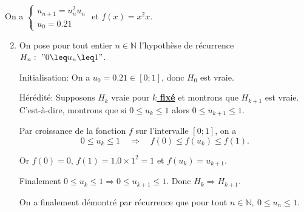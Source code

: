 \documentclass[15pt, mathserif]{beamer}
\begin{document}
\begin{frame}On a $\begin{cases} u_{n+1} = u_n^2u_n\\[1em] u_0 = 0.21\end{cases}$ et $f(x) = x^2x$.

\begin{enumerate}\setcounter{enumi}{1}

	\item On pose pour tout entier $n \in \mathbb{N}$ l'hypothèse de récurrence $H_n:~"0 \leq u_n \leq 1"$.

\medskip

Initialisation: On a $u_0 =0.21 \in [0;1]$, donc $H_0$ est vraie.

\medskip

Hérédité: Supposons $H_k$ vraie pour \textbf\underline{{$k$ fixé}} et montrons que $H_{k+1}$ est vraie. C'est-à-dire, montrons que si $0 \leq u_k \leq 1$ alors $0 \leq u_{k+1} \leq 1$.

 Par croissance de la fonction $f$ sur l'intervalle $[0;1]$, on a \[0\leq u_k \leq 1 \quad \Rightarrow \quad f(0) \leq f(u_k) \leq f(1).\]

 Or $f(0) = 0$, $f(1) = 1.0\times 1^2= 1$ et $f(u_k) = u_{k+1}$.

 Finalement $0\leq u_k \leq 1 \Rightarrow 0 \leq u_{k+1} \leq 1$. Donc $H_{k} \Rightarrow H_{k+1}$.

 On a finalement démontré par récurrence que pour tout $n \in\mathbb{N},~ 0 \leq u_n \leq 1$.

\end{enumerate}
\end{frame}
\end{document}
